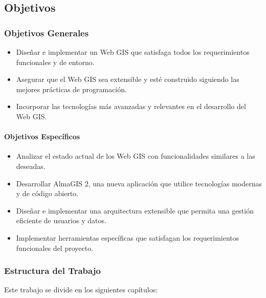 \subsection{Objetivos}\label{objetivos}


\subsubsection{Objetivos Generales}\label{objetivos-generales}

\begin{itemize}
\item
  Diseñar e implementar un Web GIS que satisfaga todos los
  requerimientos funcionales y de entorno.
\item
  Asegurar que el Web GIS sea extensible y esté construido siguiendo las
  mejores prácticas de programación.
\item
  Incorporar las tecnologías más avanzadas y relevantes en el desarrollo
  del Web GIS.
\end{itemize}


\paragraph{Objetivos Específicos}\label{objetivos-especuxedficos}

\begin{itemize}
\item
  Analizar el estado actual de los Web GIS con funcionalidades similares
  a las deseadas.
\item
  Desarrollar AlmaGIS 2, una nueva aplicación que utilice tecnologías
  modernas y de código abierto.
\item
  Diseñar e implementar una arquitectura extensible que permita una
  gestión eficiente de usuarios y datos.
\item
  Implementar herramientas específicas que satisfagan los requerimientos
  funcionales del proyecto.
\end{itemize}


\subsubsection{Estructura del Trabajo}\label{estructura-del-trabajo}

Este trabajo se divide en los siguientes capítulos:

